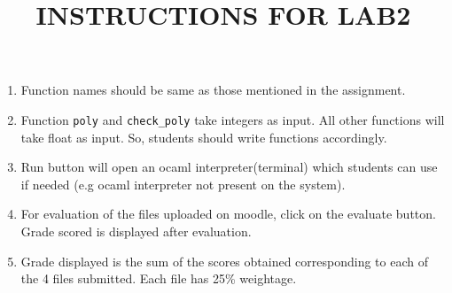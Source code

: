 \documentclass{article}
\title{INSTRUCTIONS FOR LAB2}
\begin{document}
\maketitle

\begin{enumerate}

\item Function names should be same as those mentioned in the assignment.

\item Function {\tt poly} and {\tt check\_poly} take integers as input. All other functions will take float as input. So, students should write functions accordingly.

\item Run button will open an ocaml interpreter(terminal) which students can use if needed (e.g ocaml interpreter not present on the system).

\item For evaluation of the files uploaded on moodle, click on the evaluate button. Grade scored is displayed after evaluation.
	
\item Grade displayed is the sum of the scores obtained corresponding to each of the 4 files submitted. Each file has 25\% weightage.

\end{enumerate}
\end{document}
